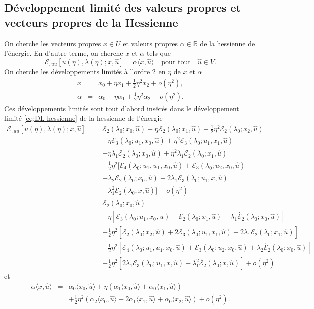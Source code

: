 \documentclass{article}
\begin{document}
\subsection{Développement limité des valeurs propres et vecteurs
propres de la Hessienne}

On cherche les vecteurs propres $x∈U$ et valeurs propres $\alpha \in
\mathbb{R}$ de la hessienne de l'énergie. En d'autre terme, on cherche $x$
et $\alpha$ tels que
\begin{equation}
  ℰ_{, u  u} [u (η), λ (η) ; x, \hat{u}] =
  \alpha \langle x, \hat{u} \rangle \quad \text{pour tout} \quad \hat{u} \in
  V.
\end{equation}
On cherche les développements limités à l'ordre 2 en $η$ de $x$
et $\alpha$
\begin{eqnarray*}
  x & = & x_0 + η x_1 + \tfrac{1}{2} η^2 x_2 + o (η^2),\\
  \alpha & = & \alpha_0 + η \alpha_1 + \tfrac{1}{2} η^2 \alpha_2 + o
  (η^2) .
\end{eqnarray*}
Ces développements limités sont tout d'abord insérés dans le
développement limité \eqref{eq:DL hessienne} de la hessienne de
l'énergie
\begin{eqnarray*}
  ℰ_{, u  u} [u (η), λ (η) ; x, \hat{u}] & = &
  ℰ_2 (λ_0 ; x_0, \hat{u}) + η ℰ_2 (λ_0 ;
  x_1, \hat{u}) + \tfrac{1}{2} η^2 ℰ_2 (λ_0 ; x_2,
  \hat{u})\\
  &  & + η ℰ_3 (λ_0 ; u_1, x_0, \hat{u}) + η^2
  ℰ_3 (λ_0 ; u_1, x_1, \hat{u})\\
  &  & + η λ_1  \dot{ℰ_2} (λ_0 ; x_0, \hat{u}) +
  η^2 λ_1  \dot{ℰ_2} (λ_0 ; x_1, \hat{u})\\
  &  & + \tfrac{1}{2} η^2  [ℰ_4 (λ_0 ; u_1, u_1, x_0,
  \hat{u})  +ℰ_3 (λ_0 ; u_2, x_0, \hat{u})\\
  &  & + λ_2  \dot{ℰ_2} (λ_0 ; x_0, \hat{u}) + 2
  λ_1  \dot{ℰ_3} (λ_0 ; u_1, x, \hat{u})\\
  &  & + λ_1^2  \ddot{ℰ_2} (λ_0 ; x, \hat{u})
  ] + o (η^2)\\
  & = & ℰ_2 (λ_0 ; x_0, \hat{u})\\
  &  & + η [ℰ_3 (λ_0 ; u_1, x_0, \hat{u}) +ℰ_2
  (λ_0 ; x_1, \hat{u}) + λ_1  \dot{ℰ_2} (λ_0 ;
  x_0, \hat{u})]\\
  &  & + \tfrac{1}{2} η^2  [ℰ_2 (λ_0 ; x_2, \hat{u}) +
  2ℰ_3 (λ_0 ; u_1, x_1, \hat{u}) + 2 λ_1
  \dot{ℰ_2} (λ_0 ; x_1, \hat{u})]\\
  &  & + \tfrac{1}{2} η^2  [ℰ_4 (λ_0 ; u_1, u_1, x_0,
  \hat{u}) +ℰ_3 (λ_0 ; u_2, x_0, \hat{u}) + λ_2
  \dot{ℰ_2} (λ_0 ; x_0, \hat{u})]\\
  &  & + \tfrac{1}{2} η^2  [2 λ_1  \dot{ℰ_3} (λ_0 ;
  u_1, x, \hat{u}) + λ_1^2  \ddot{ℰ_2} (λ_0 ; x,
  \hat{u})] + o (η^2)
\end{eqnarray*}
et
\begin{eqnarray*}
  \alpha \langle x, \hat{u} \rangle & = & \alpha_0  \langle x_0, \hat{u}
  \rangle + η (\alpha_1 \langle x_0, \hat{u} \rangle + \alpha_0 \langle
  x_1, \hat{u} \rangle)\\
  &  & + \tfrac{1}{2} η^2  (\alpha_2 \langle x_0, \hat{u} \rangle + 2
  \alpha_1 \langle x_1, \hat{u} \rangle + \alpha_0 \langle x_2, \hat{u}
  \rangle) + o (η^2) .
\end{eqnarray*}
\end{document}
